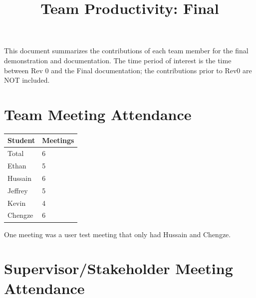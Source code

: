 \documentclass{article}
\title{Team Productivity: Final\\\progname}
\author{\authname}
\date{}
\begin{document}
\maketitle

This document summarizes the contributions of each team member for the final
demonstration and documentation.  The time period of interest is the time
between Rev 0 and the Final documentation; the contributions prior to Rev0 are
NOT included.




\section{Team Meeting Attendance}


\begin{table}[H]
\centering
\begin{tabular}{ll}
\toprule
\textbf{Student} & \textbf{Meetings}\\
\midrule
Total & 6\\
Ethan & 5\\
Hussain & 6\\
Jeffrey & 5\\
Kevin & 4\\
Chengze & 6\\
\bottomrule
\end{tabular}
\end{table}


One meeting was a user test meeting that only had Hussain and Chengze.

\section{Supervisor/Stakeholder Meeting Attendance}
\end{document}

